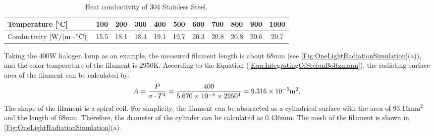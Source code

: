 
\begin{table}[htbp]
  \centering
  \caption{Heat conductivity of 304 Stainless Steel.}
    \begin{tabular}{lcccccccccc}
    \toprule
    Temperature [$^{\circ}$C] & 100   & 200   & 300   & 400   & 500   & 600   & 700   & 800   & 900   & 1000 \\
    \midrule
    Conductivity [${\rm{W/}}({\rm{m}} \cdot {}^ \circ {\rm{C}})$] & 15.5  & 18.1  & 18.4  & 19.1  & 19.7  & 20.3  & 20.8  & 20.8  & 20.6  & 20.7 \\
    \bottomrule
    \end{tabular}%
  \label{Tab:SS304HeatTransfer}%
\end{table}%





Taking the 400W halogen lamp as an example, the measured filament length is about 68mm (see \ref{Fig:OneLightRadiationSimulation}(a)), and the color temperature of the filament is 2950K. According to the Equation (\ref{Equ:IntegratingOfStefanBoltzmann}), the radiating surface area of the filament can be calculated by:
\begin{equation}
A = \frac{P}{\sigma \cdot T^4} = \frac{400}{5.670\times10^{-8}\times2950^4}=9.316\times10^{-5} {\rm{m }}^2.
\end{equation}
The shape of the filament is a spiral coil. 
For simplicity, the filament can be abstracted as a cylindrical surface with the area of 93.16mm$^2$ and the length of 68mm. Therefore, the diameter of the cylinder can be calculated as 0.436mm. The mesh of the filament is shown in \ref{Fig:OneLightRadiationSimulation}(a).



